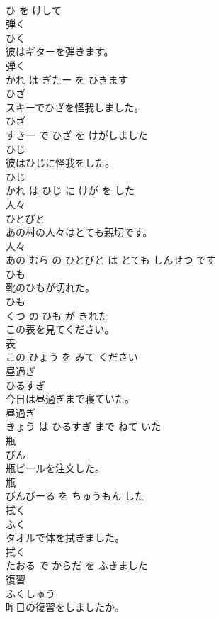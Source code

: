 \documentclass[8pt]{extreport}
\begin{document}
\begin{CJK}{UTF8}{min}
\\	ひ を けして			
\\	弾く	
\\	ひく			
\\	彼はギターを弾きます。	
\\	弾く 
\\	かれ は ぎたー を ひきます			
\\	ひざ	
\\	スキーでひざを怪我しました。	
\\	ひざ 
\\	すきー で ひざ を けがしました			
\\	ひじ	
\\	彼はひじに怪我をした。	
\\	ひじ 
\\	かれ は ひじ に けが を した			
\\	人々	
\\	ひとびと			
\\	あの村の人々はとても親切です。	
\\	人々 
\\	あの むら の ひとびと は とても しんせつ です			
\\	ひも	
\\	靴のひもが切れた。	
\\	ひも 
\\	くつ の ひも が きれた			
\\	この表を見てください。	
\\	表 
\\	この ひょう を みて ください			
\\	昼過ぎ	
\\	ひるすぎ			
\\	今日は昼過ぎまで寝ていた。	
\\	昼過ぎ 
\\	きょう は ひるすぎ まで ねて いた			
\\	瓶	
\\	びん			
\\	瓶ビールを注文した。	
\\	瓶 
\\	びんびーる を ちゅうもん した			
\\	拭く	
\\	ふく			
\\	タオルで体を拭きました。	
\\	拭く 
\\	たおる で からだ を ふきました			
\\	復習	
\\	ふくしゅう			
\\	昨日の復習をしましたか。	

\end{CJK}
\end{document}
